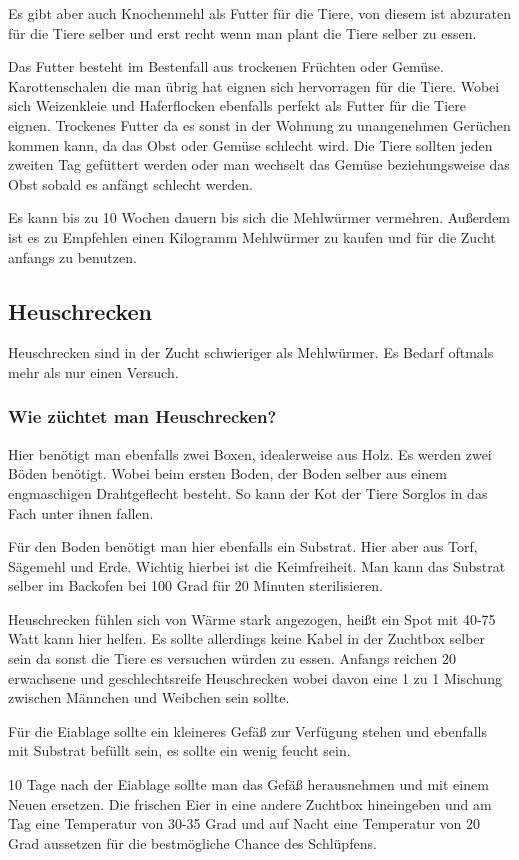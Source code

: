 Es gibt aber auch Knochenmehl als Futter für die Tiere, von diesem ist abzuraten für die Tiere selber und erst recht wenn man plant die Tiere selber zu essen. 
 
Das Futter besteht im Bestenfall aus trockenen Früchten oder Gemüse. Karottenschalen die man übrig hat eignen sich hervorragen für die Tiere. Wobei sich Weizenkleie und Haferflocken ebenfalls perfekt als Futter für die Tiere eignen. 
Trockenes Futter da es sonst in der Wohnung zu unangenehmen Gerüchen kommen kann, da das Obst oder Gemüse schlecht wird. 
Die Tiere sollten jeden zweiten Tag gefüttert werden oder man wechselt das Gemüse beziehungsweise das Obst sobald es anfängt schlecht werden.
 
Es kann bis zu 10 Wochen dauern bis sich die Mehlwürmer vermehren. Außerdem ist es zu Empfehlen einen Kilogramm Mehlwürmer zu kaufen und für die Zucht anfangs zu benutzen. 

\subsection{Heuschrecken}
Heuschrecken sind in der Zucht schwieriger als Mehlwürmer. Es Bedarf oftmals mehr als nur einen Versuch. 
\subsubsection{Wie züchtet man Heuschrecken?}
Hier benötigt man ebenfalls zwei Boxen, idealerweise aus Holz. Es werden zwei Böden benötigt. Wobei beim ersten Boden, der Boden selber aus einem engmaschigen Drahtgeflecht besteht. So kann der Kot der Tiere Sorglos in das Fach unter ihnen fallen.


Für den Boden benötigt man hier ebenfalls ein Substrat. Hier aber aus Torf, Sägemehl und Erde. Wichtig hierbei ist die Keimfreiheit. Man kann das Substrat selber im Backofen bei 100 Grad für 20 Minuten sterilisieren.


Heuschrecken fühlen sich von Wärme stark angezogen, heißt ein Spot mit 40-75 Watt kann hier helfen. Es sollte allerdings keine Kabel in der Zuchtbox selber sein da sonst die Tiere es versuchen würden zu essen. Anfangs reichen 20 erwachsene und geschlechtsreife Heuschrecken wobei davon eine 1 zu 1 Mischung zwischen Männchen und Weibchen sein sollte. 

 Für die Eiablage sollte ein kleineres Gefäß zur Verfügung stehen und ebenfalls mit Substrat befüllt sein, es sollte ein wenig feucht sein. 


10 Tage nach der Eiablage sollte man das Gefäß herausnehmen und mit einem Neuen ersetzen. Die frischen Eier in eine andere Zuchtbox hineingeben und am Tag eine Temperatur von 30-35 Grad und auf Nacht eine Temperatur von 20 Grad aussetzen für die bestmögliche Chance des Schlüpfens.

